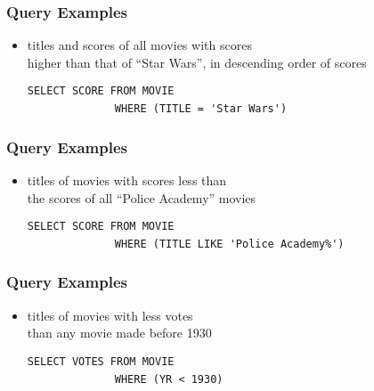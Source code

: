 \documentclass[dvipsnames]{beamer}
\theoremstyle{plain}
\begin{document}
\begin{frame}[fragile]
  \frametitle{Query Examples}

  \begin{itemize}
    \item titles and scores of all movies with scores\\
      higher than that of ``Star Wars'', in descending order of scores

      \medskip
{}
\lstinline!SELECT SCORE FROM MOVIE!\\
~~~~~~~~~~~~~~\lstinline!WHERE (TITLE = 'Star Wars')!
  \end{itemize}
\end{frame}

\begin{frame}[fragile]
  \frametitle{Query Examples}

  \begin{itemize}
    \item titles of movies with scores less than\\
      the scores of all ``Police Academy'' movies

    \medskip
{}
\lstinline!SELECT SCORE FROM MOVIE!\\
~~~~~~~~~~~~~~\lstinline!WHERE (TITLE LIKE 'Police Academy%')!
  \end{itemize}
\end{frame}

\begin{frame}[fragile]
  \frametitle{Query Examples}

  \begin{itemize}
    \item titles of movies with less votes\\
      than any movie made before 1930

    \medskip
{}
\lstinline!SELECT VOTES FROM MOVIE!\\
~~~~~~~~~~~~~~\lstinline!WHERE (YR < 1930)!
  \end{itemize}
\end{frame}
\end{document}

